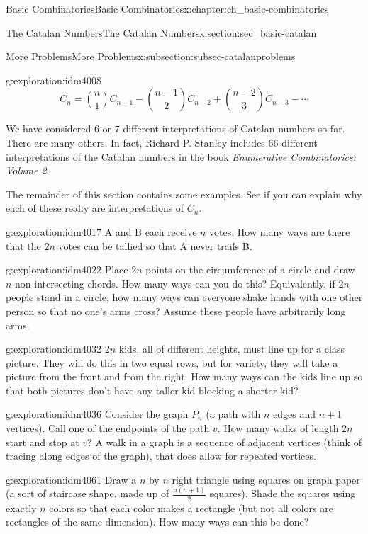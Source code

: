 \documentclass[oneside,10pt,]{book}
\numberwithin{equation}{chapter}
\begin{document}
\begin{chapterptx}{Basic Combinatorics}{}{Basic Combinatorics}{}{}{x:chapter:ch_basic-combinatorics}
\begin{sectionptx}{The Catalan Numbers}{}{The Catalan Numbers}{}{}{x:section:sec_basic-catalan}
\begin{subsectionptx}{More Problems}{}{More Problems}{}{}{x:subsection:subsec-catalanproblems}
\begin{exploration}{}{g:exploration:idm4008}
\begin{equation*}
C_{n} = \binom{n}{1} C_{n - 1} - \binom{n - 1}{2} C_{n - 2} + \binom{n - 2}{3} C_{n - 3} - \cdots
\end{equation*}
%
\end{exploration}
We have considered 6 or 7 different interpretations of Catalan numbers so far.  There are many others.  In fact, Richard P. Stanley includes 66 different interpretations of the Catalan numbers in the book \emph{Enumerative Combinatorics: Volume 2}.%
\par
The remainder of this section contains some examples.  See if you can explain why each of these really are interpretations of \(C_n\).%
\begin{exploration}{}{g:exploration:idm4017}%
A and B each receive \(n\) votes. How many ways are there that the \(2n\) votes can be tallied so that A never trails B.%
\end{exploration}
\begin{exploration}{}{g:exploration:idm4022}%
Place \(2n\) points on the circumference of a circle and draw \(n\)  non-intersecting chords.  How many ways can you do this?  Equivalently, if \(2n\) people stand in a circle, how many ways can everyone shake hands with one other person so that no one's arms cross?  Assume these people have arbitrarily long arms.%
\end{exploration}
\begin{exploration}{}{g:exploration:idm4032}%
\(2n\) kids, all of different heights, must line up for a class picture.  They will do this in two equal rows, but for variety, they will take a picture from the front and from the right.  How many ways can the kids line up so that both pictures don't have any taller kid blocking a shorter kid?%
\end{exploration}
\begin{exploration}{}{g:exploration:idm4036}%
Consider the graph \(P_n\) (a path with \(n\) edges and \(n+1\) vertices).  Call one of the endpoints of the path \(v\).  How many walks of length \(2n\) start and stop at \(v\)?  A walk in a graph is a sequence of adjacent vertices (think of tracing along edges of the graph), that does allow for repeated vertices.%
\end{exploration}
\begin{exploration}{}{g:exploration:idm4061}%
Draw a \(n\) by \(n\) right triangle using squares on graph paper (a sort of staircase shape, made up of \(\frac{n(n+1)}{2}\) squares).  Shade the squares using exactly \(n\) colors so that each color makes a rectangle (but not all colors are rectangles of the same dimension).  How many ways can this be done?%

\end{exploration}
\end{subsectionptx}
\end{sectionptx}
\end{chapterptx}
\end{document}
